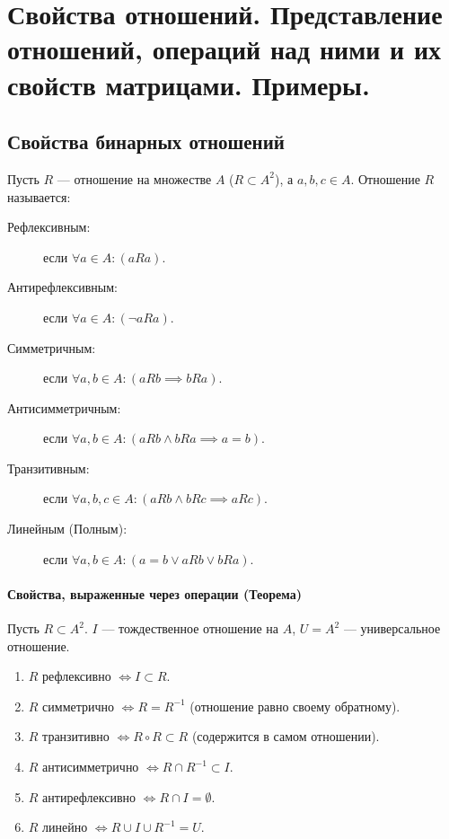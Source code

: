 \section{Свойства отношений. Представление отношений, операций над ними и их свойств матрицами. Примеры.}


\subsection*{Свойства бинарных отношений}

Пусть $R$ --- отношение на множестве $A$ ($R \subset A^2$), а $a, b, c \in A$. Отношение $R$ называется:

\begin{description}
    \item[Рефлексивным:] если $\forall a \in A : (a R a)$.
    \item[Антирефлексивным:] если $\forall a \in A : (\neg a R a)$.
    \item[Симметричным:] если $\forall a, b \in A : (a R b \implies b R a)$.
    \item[Антисимметричным:] если $\forall a, b \in A : (a R b \land b R a \implies a = b)$.
    \item[Транзитивным:] если $\forall a, b, c \in A : (a R b \land b R c \implies a R c)$.
    \item[Линейным (Полным):] если $\forall a, b \in A : (a = b \lor a R b \lor b R a)$.
\end{description}

\paragraph{Свойства, выраженные через операции (Теорема)}
Пусть $R \subset A^2$. $I$ --- тождественное отношение на $A$, $U = A^2$ --- универсальное отношение.
\begin{enumerate}
    \item $R$ рефлексивно $\iff I \subset R$.
    \item $R$ симметрично $\iff R = R^{-1}$ (отношение равно своему обратному).
    \item $R$ транзитивно $\iff R \circ R \subset R$ (содержится в самом отношении).
    \item $R$ антисимметрично $\iff R \cap R^{-1} \subset I$.
    \item $R$ антирефлексивно $\iff R \cap I = \emptyset$.
    \item $R$ линейно $\iff R \cup I \cup R^{-1} = U$.
\end{enumerate}

